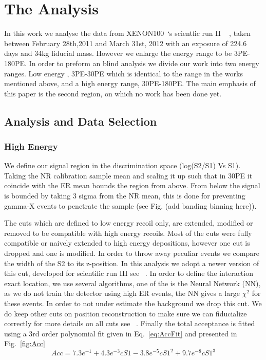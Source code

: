 \documentclass[twocolumn, showpacs, showkeys, amsmath, amssymb, floatfix]{revtex4}
\newcommand{\Xehund}{{XENON100}}
\begin{document}
\section{The Analysis}
In this work we analyse the data from \Xehund\ `s scientfic run II ~\cite{xe100_run10_si,xe100_run10_sd} , taken between February 28th,2011 and March 31st, 2012 with an exposure of 224.6 days and 34kg fiducial mass.  However we enlarge the energy range to be 3PE-180PE. In order to preform an blind analysis we divide our work into two energy ranges. Low energy , 3PE-30PE which is identical to the range in the works mentioned above, and a high energy range, 30PE-180PE. The main emphasis of this paper is the second region, on which no work has been done yet.
\subsection{Analysis and Data Selection}
\subsubsection{High Energy}
We define our signal region in the discrimination space (log(S2/S1) Vs S1). Taking the NR calibration sample mean and scaling it up such that in 30PE it coincide with the ER mean bounds the region from above. From below the signal is bounded by taking 3 sigma from the NR mean, this is done for preventing gamma-X events to penetrate the sample (see Fig. (add banding  binning here)).

The cuts which are defined to low energy recoil only, are extended, modified or removed to be compatible with high energy recoils. Most of the cuts were fully compatible or naively extended to high energy depositions, however one cut is dropped and one is modified. In order to throw away peculiar events we compare the width of the S2 to its z-position. In this analysis we adopt a newer version of this cut, developed for scientific run III see ~\cite{xe100_run_combination}. In order to define the interaction exact location, we use several algorithms, one of the is the Neural Network (NN), as we do not train the detector using high ER events, the NN gives a large $\chi^2$ for these events. In order to not under estimate the background we drop this cut. We do keep other cuts on position reconstruction to make sure we can fiducialize correctly for more details on all cuts see ~\cite{xe100_ana2012}. Finally the total acceptance is fitted using a 3rd order polynomial fit given in Eq.~\ref{eq:AccFit} and presented in Fig.~\ref{fig:Acc}
\begin{equation}
\label{eq:AccFit}
	Acc = 7.3e^{-1}+4.3e^{-3}cS1-3.8e^{-5}cS1^2+9.7e^{-8}cS1^3
\end{equation}
\end{document}
